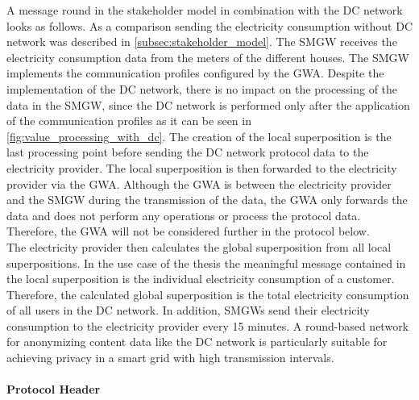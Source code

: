 A message round in the stakeholder model in combination with the DC network looks as follows. As a comparison sending the electricity consumption without DC network was described in \ref{subsec:stakeholder_model}. The \gls{SMGW} receives the electricity consumption data from the meters of the different houses. The \gls{SMGW} implements the communication profiles configured by the \gls{GWA}. Despite the implementation of the DC network, there is no impact on the processing of the data in the \gls{SMGW}, since the DC network is performed only after the application of the communication profiles as it can be seen in \ref{fig:value_processing_with_dc}. The creation of the local superposition is the last processing point before sending the DC network protocol data to the electricity provider. The local superposition is then forwarded to the electricity provider via the \gls{GWA}. Although the \gls{GWA} is between the electricity provider and the \gls{SMGW} during the transmission of the data, the \gls{GWA} only forwards the data and does not perform any operations or process the protocol data. Therefore, the \gls{GWA} will not be considered further in the protocol below.\\ The electricity provider then calculates the global superposition from all local superpositions. In the use case of the thesis the meaningful message contained in the local superposition is the individual electricity consumption of a customer. Therefore, the calculated global superposition is the total electricity consumption of all users in the DC network. In addition, \gls{SMGW}s send their electricity consumption to the electricity provider every 15 minutes. A round-based network for anonymizing content data like the DC network is particularly suitable for achieving privacy in a smart grid with high transmission intervals.
\\
\\
\textbf{Protocol Header}
\\
